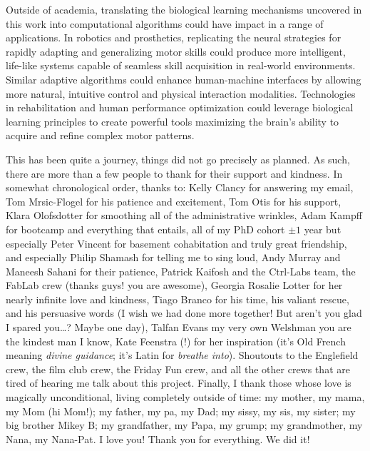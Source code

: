 \begin{impactstatement}
Outside of academia, translating the biological learning mechanisms uncovered in this work into computational algorithms could have impact in a range of applications. In robotics and prosthetics, replicating the neural strategies for rapidly adapting and generalizing motor skills could produce more intelligent, life-like systems capable of seamless skill acquisition in real-world environments. Similar adaptive algorithms could enhance human-machine interfaces by allowing more natural, intuitive control and physical interaction modalities. Technologies in rehabilitation and human performance optimization could leverage biological learning principles to create powerful tools maximizing the brain's ability to acquire and refine complex motor patterns.
\end{impactstatement}

\begin{acknowledgements}
    
    This has been quite a journey, things did not go precisely as planned. As such, there are more than a few people to thank for their support and kindness. In somewhat chronological order, thanks to: Kelly Clancy for answering my email, Tom Mrsic-Flogel for his patience and excitement, Tom Otis for his support, Klara Olofsdotter for smoothing all of the administrative wrinkles, Adam Kampff for bootcamp and everything that entails, all of my PhD cohort $\pm1$ year but especially Peter Vincent for basement cohabitation and truly great friendship, and especially Philip Shamash for telling me to sing loud, Andy Murray and Maneesh Sahani for their patience, Patrick Kaifosh and the Ctrl-Labs team, the FabLab crew (thanks guys! you are awesome), Georgia Rosalie Lotter for her nearly infinite love and kindness, Tiago Branco for his time, his valiant rescue, and his persuasive words (I wish we had done more together! But aren't you glad I spared you\ldots? Maybe one day), Talfan Evans my very own Welshman you are the kindest man I know, Kate Feenstra (!) for her inspiration (it's Old French meaning \textit{divine guidance}; it's Latin for \textit{breathe into}). Shoutouts to the Englefield crew, the film club crew, the Friday Fun crew, and all the other crews that are tired of hearing me talk about this project. Finally, I thank those whose love is magically unconditional, living completely outside of time: my mother, my mama, my Mom (hi Mom!); my father, my pa, my Dad; my sissy, my sis, my sister; my big brother Mikey B; my grandfather, my Papa, my grump; my grandmother, my Nana, my Nana-Pat. I love you! Thank you for everything. We did it!

\end{acknowledgements}

\setcounter{tocdepth}{2}
\cleardoublepage\tableofcontents

\cleardoublepage\listoffigures

